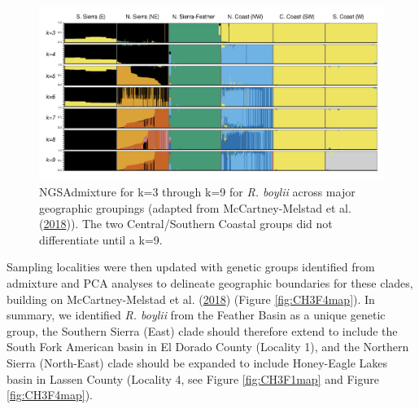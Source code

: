 \documentclass[proquest,12pt,final]{ucthesis-CA2012} %
\begin{document}
\begin{ucmainmatter}
\begin{figure}

{\centering \includegraphics[width=0.95\linewidth]{figure/ch3/fig_03_admix_stacked_combined_rabo_filt_100k} 

}

\caption{NGSAdmixture for k=3 through k=9 for \emph{R. boylii}
across major geographic groupings (adapted from McCartney-Melstad et al.
(\protect\hyperlink{ref-mccartney-melstad_population_2018}{2018})). The
two Central/Southern Coastal groups did not differentiate until a k=9.}\label{fig:CH3F3admix}
\end{figure}
Sampling localities were then updated with genetic groups identified
from admixture and PCA analyses to delineate geographic boundaries for
these clades, building on McCartney-Melstad et al.
(\protect\hyperlink{ref-mccartney-melstad_population_2018}{2018})
(Figure \ref{fig:CH3F4map}). In summary, we identified \emph{R. boylii}
from the Feather Basin as a unique genetic group, the Southern Sierra
(East) clade should therefore extend to include the South Fork American
basin in El Dorado County (Locality 1), and the Northern Sierra
(North-East) clade should be expanded to include Honey-Eagle Lakes basin
in Lassen County (Locality 4, see Figure \ref{fig:CH3F1map} and Figure
\ref{fig:CH3F4map}).

\clearpage








\end{ucmainmatter}
\end{document}
